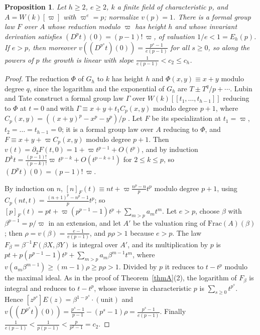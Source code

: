\documentclass[11pt]{amsart}
\newtheorem{proposition}[thm]{Proposition}
\theoremstyle{definition}
\theoremstyle{remark}
\begin{document}
\begin{proposition}\label{prop:ramified}
Let $h\ge2$, $e\ge2$, $k$ a finite field of characteristic $p$, and $A=W(k)[\varpi]$ with $\varpi^e=p$; normalize $v(p)=1$. There is a formal group law $F$ over $A$ whose reduction modulo $\varpi$ has height $h$ and whose invariant derivation satisfies $(D^pt)(0)=(p-1)!\,\varpi$, of valuation $1/e<1=E_h(p)$. If $e>p$, then moreover $v((D^{p^s}t)(0))=\frac{p^s-1}{e(p-1)}$ for all $s\ge0$, so along the powers of $p$ the growth is linear with slope $\frac1{e(p-1)}<c_2\le c_h$.
\end{proposition}

\begin{proof}
The reduction $\Phi$ of $G_h$ to $k$ has height $h$ and $\Phi(x,y)\equiv x+y$ modulo degree $q$, since the logarithm and the exponential of $G_h$ are $T\pm T^q/p+\cdots$. Lubin and Tate construct a formal group law $\Gamma$ over $W(k)[[t_1,\dots,t_{h-1}]]$ reducing to $\Phi$ at $t=0$ and with $\Gamma\equiv x+y+t_1C_p(x,y)$ modulo degree $p+1$, where $C_p(x,y)=((x+y)^p-x^p-y^p)/p$ \cite[Proposition 1.1, pp.~50--51]{LT66}. Let $F$ be its specialization at $t_1=\varpi$, $t_2=\dots=t_{h-1}=0$; it is a formal group law over $A$ reducing to $\Phi$, and $F\equiv x+y+\varpi C_p(x,y)$ modulo degree $p+1$. Then $v(t)=\partial_2F(t,0)=1+\varpi t^{p-1}+O(t^p)$, and by induction $D^kt=\frac{(p-1)!}{(p-k)!}\varpi\,t^{p-k}+O(t^{p-k+1})$ for $2\le k\le p$, so $(D^pt)(0)=(p-1)!\,\varpi$.

By induction on $n$, $[n]_F(t)\equiv nt+\varpi\frac{n^p-n}p t^p$ modulo degree $p+1$, using $C_p(nt,t)=\frac{(n+1)^p-n^p-1}pt^p$; so $[p]_F(t)=pt+\varpi(p^{p-1}-1)t^p+\sum_{m>p}a_mt^m$. Let $e>p$, choose $\beta$ with $\beta^{p-1}=p/\varpi$ in an extension, and let $A'$ be the valuation ring of $\mathrm{Frac}(A)(\beta)$; then $\rho=v(\beta)=\frac{e-1}{e(p-1)}$, and $p\rho>1$ because $e>p$. The law $F_\beta=\beta^{-1}F(\beta X,\beta Y)$ is integral over $A'$, and its multiplication by $p$ is $pt+p(p^{p-1}-1)t^p+\sum_{m>p}a_m\beta^{m-1}t^m$, where $v(a_m\beta^{m-1})\ge(m-1)\rho\ge p\rho>1$. Divided by $p$ it reduces to $t-t^p$ modulo the maximal ideal. As in the proof of Theorem~\ref{thmA}(2), the logarithm of $F_\beta$ is integral and reduces to $t-t^p$, whose inverse in characteristic $p$ is $\sum_{s\ge0}t^{p^s}$. Hence $[z^{p^s}]E(z)=\beta^{1-p^s}\cdot(\text{unit})$ and $v((D^{p^s}t)(0))=\frac{p^s-1}{p-1}-(p^s-1)\rho=\frac{p^s-1}{e(p-1)}$. Finally $\frac1{e(p-1)}<\frac1{p(p-1)}<\frac p{p^2-1}=c_2$.
\end{proof}
\end{document}
